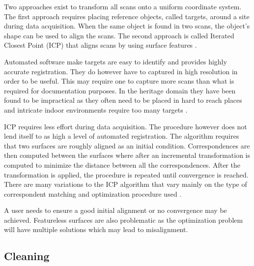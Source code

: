 Two approaches exist to transform all scans onto a uniform coordinate system. The first approach requires placing reference objects, called targets, around a site during data acquisition. When the same object is found in two scans, the object's shape can be used to align the scans. The second approach is called Iterated Closest Point (ICP) that aligns scans by using surface features \cite{Besl1992}.

Automated software make targets are easy to identify and provides highly accurate registration. They do however have to captured in high resolution in order to be useful. This may require one to capture more scans than what is required for documentation purposes. In the heritage domain they have been found to be impractical as they often need to be placed in hard to reach places and intricate indoor environments require too many targets \cite{Ruther2011}. 

ICP requires less effort during data acquisition. The procedure however does not lend itself to as high a level of automated registration. The algorithm requires that two surfaces are roughly aligned as an initial condition. Correspondences are then computed between the surfaces where after an incremental transformation is computed to minimize the distance between all the correspondences. After the transformation is applied, the procedure is repeated until convergence is reached. There are many variations to the ICP algorithm that vary mainly on the type of correspondent matching and optimization procedure used \cite{Besl1992}.  

A user needs to ensure a good initial alignment or no convergence may be achieved. Featureless surfaces are also problematic as the optimization problem will have multiple solutions which may lead to misalignment.

\subsection{Cleaning}\label{sec:cleaning}

